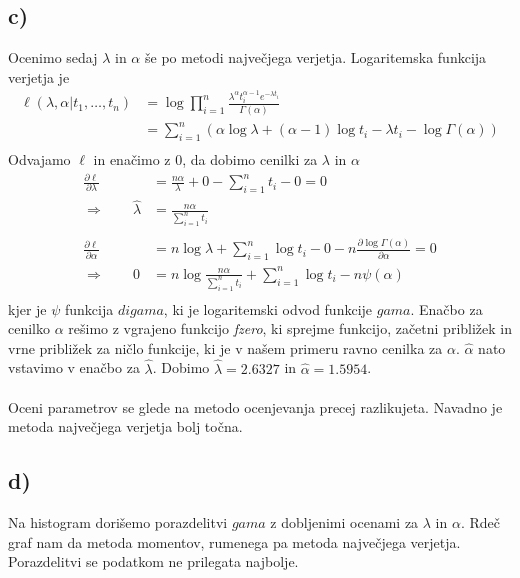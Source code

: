 \documentclass[A4paper, 11pt]{article}
\begin{document}
\subsection*{c)}
Ocenimo sedaj  $\lambda$ in $\alpha$ še po metodi največjega verjetja. Logaritemska funkcija verjetja je 
\[
\begin{split}
\ell (\lambda, \alpha | t_1, \ldots, t_n) & = \log{\prod_{i=1}^{n} \frac{\lambda^\alpha t_i^{\alpha - 1} e^{- \lambda t_i}}{\Gamma (\alpha)}} \\
                                                              & = \sum_{i=1}^{n} (\alpha \log{\lambda} + (\alpha - 1) \log{t_i} - \lambda t_i - \log{\Gamma (\alpha)}) \\
\end{split}
\]
Odvajamo $\ell$ in enačimo z 0, da dobimo cenilki za $\lambda$ in $\alpha$
\[
\begin{split}
\frac{\partial \ell}{\partial \lambda} & = \frac{n \alpha}{\lambda} + 0 - \sum_{i=1}^{n} t_i - 0 = 0 \\
\Rightarrow \qquad \hat{\lambda} & = \frac{n \alpha}{\sum_{i=1}^{n} t_i} \\
\\
\frac{\partial \ell}{\partial \alpha} & = n \log{\lambda} + \sum_{i=1}^{n} \log{t_i} - 0 - n \frac{\partial \log{\Gamma (\alpha)}}{\partial \alpha} = 0 \\
\Rightarrow \qquad 0 & =  n \log{\frac{n \alpha}{\sum_{i=1}^{n} t_i}} + \sum_{i=1}^{n} \log{t_i} - n \psi(\alpha) \\
\end{split}
\]
kjer je $\psi$ funkcija $digama$, ki je logaritemski odvod funkcije $gama$. Enačbo za cenilko $\alpha$ rešimo z vgrajeno funkcijo \textit{fzero}, ki sprejme funkcijo, začetni približek in vrne približek za ničlo funkcije, ki je v našem primeru ravno cenilka za $\alpha$. $\hat{\alpha}$ nato vstavimo v enačbo za $\hat{\lambda}$. Dobimo $\hat{\lambda} = 2.6327$ in $\hat{\alpha} = 1.5954$. \\
\\
Oceni parametrov se glede na metodo ocenjevanja precej razlikujeta. Navadno je metoda največjega verjetja bolj točna.

\subsection*{d)}
Na histogram dorišemo porazdelitvi $gama$ z dobljenimi ocenami za $\lambda$ in $\alpha$. Rdeč graf nam da metoda momentov, rumenega pa metoda največjega verjetja. Porazdelitvi se podatkom ne prilegata najbolje.
\end{document}
